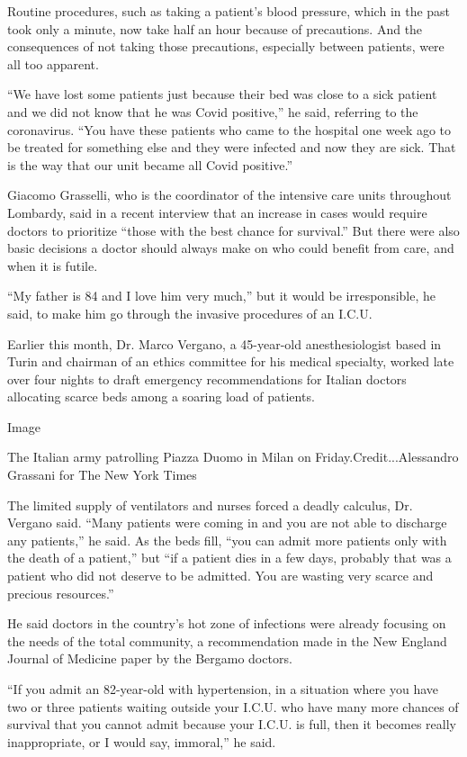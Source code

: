 Routine procedures, such as taking a patient's blood pressure, which in
the past took only a minute, now take half an hour because of
precautions. And the consequences of not taking those precautions,
especially between patients, were all too apparent.

``We have lost some patients just because their bed was close to a sick
patient and we did not know that he was Covid positive,'' he said,
referring to the coronavirus. ``You have these patients who came to the
hospital one week ago to be treated for something else and they were
infected and now they are sick. That is the way that our unit became all
Covid positive.''

Giacomo Grasselli, who is the coordinator of the intensive care units
throughout Lombardy, said in a recent interview that an increase in
cases would require doctors to prioritize ``those with the best chance
for survival.'' But there were also basic decisions a doctor should
always make on who could benefit from care, and when it is futile.

``My father is 84 and I love him very much,'' but it would be
irresponsible, he said, to make him go through the invasive procedures
of an I.C.U.

Earlier this month, Dr. Marco Vergano, a 45-year-old anesthesiologist
based in Turin and chairman of an ethics committee for his medical
specialty, worked late over four nights to draft emergency
recommendations for Italian doctors allocating scarce beds among a
soaring load of patients.

Image

The Italian army patrolling Piazza Duomo in Milan on
Friday.Credit...Alessandro Grassani for The New York Times

The limited supply of ventilators and nurses forced a deadly calculus,
Dr. Vergano said. ``Many patients were coming in and you are not able to
discharge any patients,'' he said. As the beds fill, ``you can admit
more patients only with the death of a patient,'' but ``if a patient
dies in a few days, probably that was a patient who did not deserve to
be admitted. You are wasting very scarce and precious resources.''

He said doctors in the country's hot zone of infections were already
focusing on the needs of the total community, a recommendation made in
the New England Journal of Medicine paper by the Bergamo doctors.

``If you admit an 82-year-old with hypertension, in a situation where
you have two or three patients waiting outside your I.C.U. who have many
more chances of survival that you cannot admit because your I.C.U. is
full, then it becomes really inappropriate, or I would say, immoral,''
he said.

